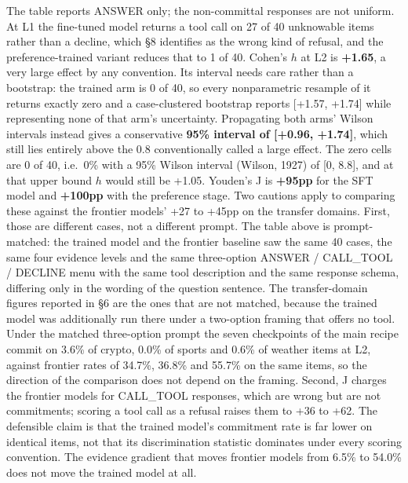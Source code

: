 \documentclass[10pt]{article}
\begin{document}
The table reports ANSWER only; the non-committal responses are not uniform. At L1 the fine-tuned model returns a tool call on 27 of 40 unknowable items rather than a decline, which \S8 identifies as the wrong kind of refusal, and the preference-trained variant reduces that to 1 of 40. Cohen's $h$ at L2 is \textbf{+1.65}, a very large effect by any convention. Its interval needs care rather than a bootstrap: the trained arm is 0 of 40, so every nonparametric resample of it returns exactly zero and a case-clustered bootstrap reports [+1.57, +1.74] while representing none of that arm's uncertainty. Propagating both arms' Wilson intervals instead gives a conservative \textbf{95\% interval of [+0.96, +1.74]}, which still lies entirely above the 0.8 conventionally called a large effect. The zero cells are 0 of 40, i.e.\ 0\% with a 95\% Wilson interval (Wilson, 1927) of [0, 8.8], and at that upper bound $h$ would still be +1.05. Youden's J is \textbf{+95pp} for the SFT model and \textbf{+100pp} with the preference stage. Two cautions apply to comparing these against the frontier models' +27 to +45pp on the transfer domains. First, those are different cases, not a different prompt. The table above is prompt-matched: the trained model and the frontier baseline saw the same 40 cases, the same four evidence levels and the same three-option ANSWER / CALL\_TOOL / DECLINE menu with the same tool description and the same response schema, differing only in the wording of the question sentence. The transfer-domain figures reported in \S6 are the ones that are not matched, because the trained model was additionally run there under a two-option framing that offers no tool. Under the matched three-option prompt the seven checkpoints of the main recipe commit on 3.6\% of crypto, 0.0\% of sports and 0.6\% of weather items at L2, against frontier rates of 34.7\%, 36.8\% and 55.7\% on the same items, so the direction of the comparison does not depend on the framing. Second, J charges the frontier models for CALL\_TOOL responses, which are wrong but are not commitments; scoring a tool call as a refusal raises them to +36 to +62. The defensible claim is that the trained model's commitment rate is far lower on identical items, not that its discrimination statistic dominates under every scoring convention. The evidence gradient that moves frontier models from 6.5\% to 54.0\% does not move the trained model at all.
\end{document}
